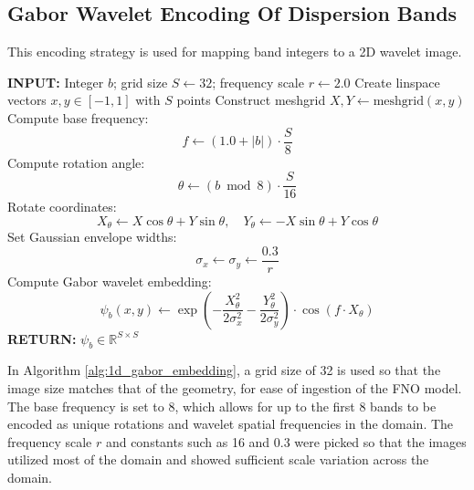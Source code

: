 \documentclass[preprint,review,12pt]{elsarticle}
\begin{document}
\subsection{Gabor Wavelet Encoding Of Dispersion Bands}
This encoding strategy is used for mapping band integers to a 2D wavelet image.
\begin{algorithm}[H]
\caption{1D Gabor Wavelet Embedding from Scalar Input}
\label{alg:1d_gabor_embedding}
\begin{algorithmic}[1]
\STATE \textbf{INPUT:} Integer \( b \); grid size \( S \leftarrow 32 \); frequency scale \( r \leftarrow 2.0 \)
\STATE Create linspace vectors \( x, y \in [-1, 1] \) with \( S \) points
\STATE Construct meshgrid \( X, Y \leftarrow \text{meshgrid}(x, y) \)
\STATE Compute base frequency:
\[
f \leftarrow (1.0 + |b|) \cdot \frac{S}{8}
\]
\STATE Compute rotation angle:
\[
\theta \leftarrow (b \bmod 8) \cdot \frac{S}{16}
\]
\STATE Rotate coordinates:
\[
X_\theta \leftarrow X \cos \theta + Y \sin \theta, \quad
Y_\theta \leftarrow -X \sin \theta + Y \cos \theta
\]
\STATE Set Gaussian envelope widths:
\[
\sigma_x \leftarrow \sigma_y \leftarrow \frac{0.3}{r}
\]
\STATE Compute Gabor wavelet embedding:
\[
\psi_b(x, y) \leftarrow
\exp\left(-\frac{X_\theta^2}{2 \sigma_x^2} - \frac{Y_\theta^2}{2 \sigma_y^2}\right)
\cdot \cos(f \cdot X_\theta)
\]
\STATE \textbf{RETURN:} \( \psi_b \in \mathbb{R}^{S \times S} \)
\end{algorithmic}
\end{algorithm}

In Algorithm \ref{alg:1d_gabor_embedding}, a grid size of 32 is used so that the image size matches that of the geometry, for ease of ingestion of the FNO model. The base frequency is set to 8, which allows for up to the first 8 bands to be encoded as unique rotations and wavelet spatial frequencies in the domain. The frequency scale $r$ and constants such as 16 and 0.3 were picked so that the images utilized most of the domain and showed sufficient scale variation across the domain.
\end{document}

